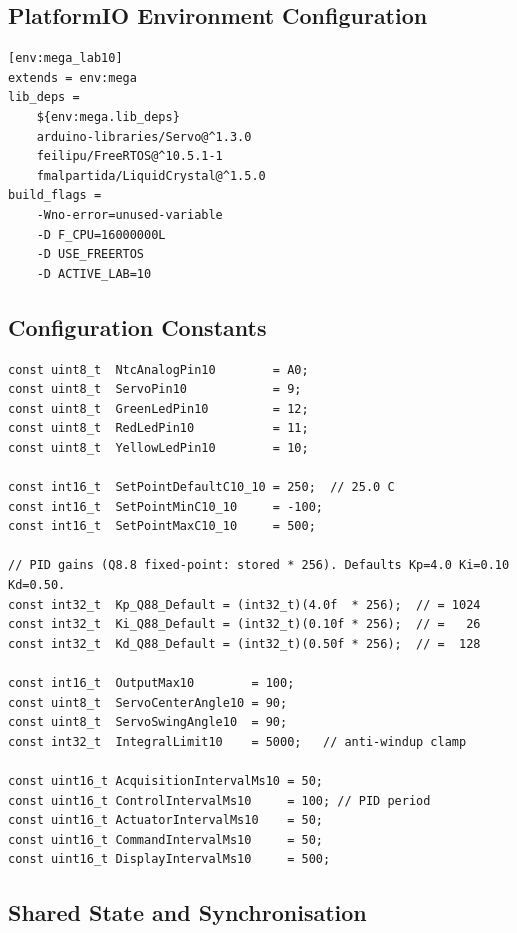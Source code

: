 \documentclass[12pt]{article}
\begin{document}
\subsection{PlatformIO Environment Configuration}

\begin{lstlisting}
[env:mega_lab10]
extends = env:mega
lib_deps =
    ${env:mega.lib_deps}
    arduino-libraries/Servo@^1.3.0
    feilipu/FreeRTOS@^10.5.1-1
    fmalpartida/LiquidCrystal@^1.5.0
build_flags =
    -Wno-error=unused-variable
    -D F_CPU=16000000L
    -D USE_FREERTOS
    -D ACTIVE_LAB=10
\end{lstlisting}

\subsection{Configuration Constants}

\begin{lstlisting}[caption={Lab10Config.h --- key constants}]
const uint8_t  NtcAnalogPin10        = A0;
const uint8_t  ServoPin10            = 9;
const uint8_t  GreenLedPin10         = 12;
const uint8_t  RedLedPin10           = 11;
const uint8_t  YellowLedPin10        = 10;

const int16_t  SetPointDefaultC10_10 = 250;  // 25.0 C
const int16_t  SetPointMinC10_10     = -100;
const int16_t  SetPointMaxC10_10     = 500;

// PID gains (Q8.8 fixed-point: stored * 256). Defaults Kp=4.0 Ki=0.10 Kd=0.50.
const int32_t  Kp_Q88_Default = (int32_t)(4.0f  * 256);  // = 1024
const int32_t  Ki_Q88_Default = (int32_t)(0.10f * 256);  // =   26
const int32_t  Kd_Q88_Default = (int32_t)(0.50f * 256);  // =  128

const int16_t  OutputMax10        = 100;
const uint8_t  ServoCenterAngle10 = 90;
const uint8_t  ServoSwingAngle10  = 90;
const int32_t  IntegralLimit10    = 5000;   // anti-windup clamp

const uint16_t AcquisitionIntervalMs10 = 50;
const uint16_t ControlIntervalMs10     = 100; // PID period
const uint16_t ActuatorIntervalMs10    = 50;
const uint16_t CommandIntervalMs10     = 50;
const uint16_t DisplayIntervalMs10     = 500;
\end{lstlisting}

\subsection{Shared State and Synchronisation}
\end{document}

